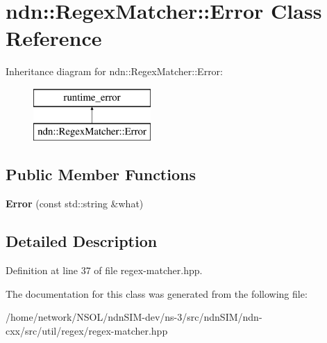 \hypertarget{classndn_1_1RegexMatcher_1_1Error}{}\section{ndn\+:\+:Regex\+Matcher\+:\+:Error Class Reference}
\label{classndn_1_1RegexMatcher_1_1Error}
Inheritance diagram for ndn\+:\+:Regex\+Matcher\+:\+:Error\+:\begin{figure}[H]
\begin{center}
\leavevmode
\includegraphics[height=2.000000cm]{classndn_1_1RegexMatcher_1_1Error}
\end{center}
\end{figure}
\subsection*{Public Member Functions}
\begin{DoxyCompactItemize}
\item 
{\bfseries Error} (const std\+::string \&what)\hypertarget{classndn_1_1RegexMatcher_1_1Error_a196223219ce38992b32d0e2235db75c8}{}\label{classndn_1_1RegexMatcher_1_1Error_a196223219ce38992b32d0e2235db75c8}

\end{DoxyCompactItemize}


\subsection{Detailed Description}


Definition at line 37 of file regex-\/matcher.\+hpp.



The documentation for this class was generated from the following file\+:\begin{DoxyCompactItemize}
\item 
/home/network/\+N\+S\+O\+L/ndn\+S\+I\+M-\/dev/ns-\/3/src/ndn\+S\+I\+M/ndn-\/cxx/src/util/regex/regex-\/matcher.\+hpp\end{DoxyCompactItemize}
